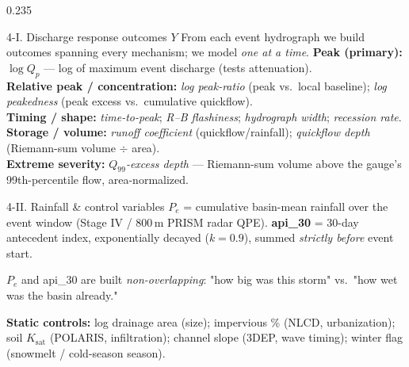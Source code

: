 \documentclass[final]{beamer}
\newcommand{\hl}[1]{\colorbox{robustbg}{\parbox{0.95\linewidth}{\color{dukenavy}#1}}}
\begin{document}
\begin{frame}[t]
\begin{columns}[t]
\begin{column}{0.235\paperwidth}
\begin{block}{4-I. Discharge response outcomes $Y$}
From each event hydrograph we build outcomes spanning every mechanism; we model \emph{one at a time}.
\vskip3pt
\textbf{Peak (primary):} $\log Q_p$ --- log of maximum event discharge (tests attenuation).\\
\textbf{Relative peak / concentration:} \emph{log peak-ratio} (peak vs.\ local baseline);
\emph{log peakedness} (peak excess vs.\ cumulative quickflow).\\
\textbf{Timing / shape:} \emph{time-to-peak}; \emph{R--B flashiness}; \emph{hydrograph width};
\emph{recession rate}.\\
\textbf{Storage / volume:} \emph{runoff coefficient} (quickflow/rainfall); \emph{quickflow depth}
(Riemann-sum volume $\div$ area).\\
\textbf{Extreme severity:} \emph{$Q_{99}$-excess depth} --- Riemann-sum volume above the gauge's
99th-percentile flow, area-normalized.
\end{block}

\begin{block}{4-II. Rainfall \& control variables}
\textbf{$P_e$} = cumulative basin-mean rainfall over the event window (Stage IV / 800\,m PRISM radar QPE).
\textbf{api\_30} = 30-day antecedent index, exponentially decayed ($k=0.9$), summed \emph{strictly before}
event start.
\vskip3pt
\hl{$P_e$ and api\_30 are built \emph{non-overlapping}: "how big was this storm" vs.\ "how wet was the
basin already."}
\vskip4pt
\textbf{Static controls:} log drainage area (size); impervious \% (NLCD, urbanization);
soil $K_{\text{sat}}$ (POLARIS, infiltration); channel slope (3DEP, wave timing); winter flag
(snowmelt / cold-season season).
\end{block}


\end{column}
\end{columns}
\end{frame}
\end{document}
